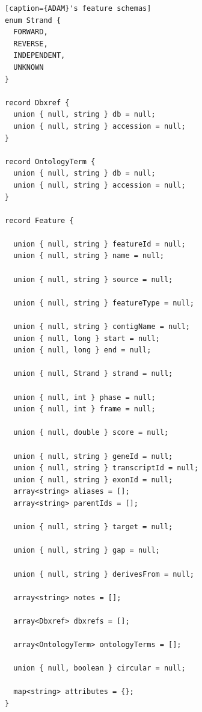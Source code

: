 \documentclass[phd]{ucbthesis}
\begin{document}
\begin{lstlisting}[caption={ADAM}'s feature schemas]
enum Strand {
  FORWARD,
  REVERSE,
  INDEPENDENT,
  UNKNOWN
}

record Dbxref {
  union { null, string } db = null;
  union { null, string } accession = null;
}

record OntologyTerm {
  union { null, string } db = null;
  union { null, string } accession = null;
}

record Feature {

  union { null, string } featureId = null;
  union { null, string } name = null;

  union { null, string } source = null;

  union { null, string } featureType = null;

  union { null, string } contigName = null;
  union { null, long } start = null;
  union { null, long } end = null;

  union { null, Strand } strand = null;

  union { null, int } phase = null;
  union { null, int } frame = null;

  union { null, double } score = null;

  union { null, string } geneId = null;
  union { null, string } transcriptId = null;
  union { null, string } exonId = null;
  array<string> aliases = [];
  array<string> parentIds = [];

  union { null, string } target = null;

  union { null, string } gap = null;

  union { null, string } derivesFrom = null;

  array<string> notes = [];

  array<Dbxref> dbxrefs = [];

  array<OntologyTerm> ontologyTerms = [];

  union { null, boolean } circular = null;

  map<string> attributes = {};
}
\end{lstlisting}

\backmatter



\end{document}
